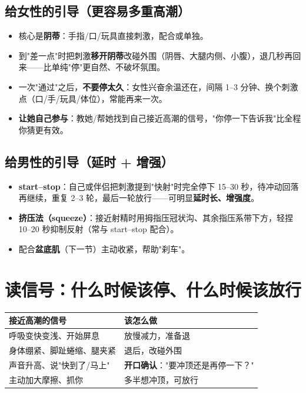 \subsection*{给女性的引导（更容易多重高潮）}
\begin{itemize}[leftmargin=2em,itemsep=0.3em]
  \item 核心是\textbf{阴蒂}：手指/口/玩具直接刺激，配合或单独。
  \item 到"差一点"时把刺激\textbf{移开阴蒂}改碰外围（阴唇、大腿内侧、小腹），退几秒再回来——比单纯"停"更自然、不破坏氛围。
  \item 一次"通过"之后，\textbf{不要停太久}：女性兴奋余温还在，间隔 1--3 分钟、换个刺激点（口/手/玩具/体位），常能再来一次。
  \item \textbf{让她自己参与}：教她/帮她找到自己接近高潮的信号，"你停一下告诉我"比全程你猜更有效。
\end{itemize}

\subsection*{给男性的引导（延时 + 增强）}
\begin{itemize}[leftmargin=2em,itemsep=0.3em]
  \item \textbf{start--stop}：自己或伴侣把刺激提到"快射"时完全停下 15--30 秒，待冲动回落再继续，重复 2--3 轮，最后一轮放行——可明显\textbf{延时长、增强度}。
  \item \textbf{挤压法（squeeze）}：接近射精时用拇指压冠状沟、其余指压系带下方，轻捏 10--20 秒抑制反射（常与 start--stop 配合）。
  \item 配合\textbf{盆底肌}（下一节）主动收紧，帮助"刹车"。
\end{itemize}

\section{读信号：什么时候该停、什么时候该放行}
\begin{tabularx}{\textwidth}{l X}
\toprule
\textbf{接近高潮的信号} & \textbf{该怎么做} \\
\midrule
呼吸变快变浅、开始屏息 & 放慢减力，准备退 \\
身体绷紧、脚趾蜷缩、腿夹紧 & 退后，改碰外围 \\
声音升高、说"快到了/马上" & \textbf{开口确认}："要冲顶还是再停一下？" \\
主动加大摩擦、抓你 & 多半想冲顶，可放行 \\
\bottomrule
\end{tabularx}

